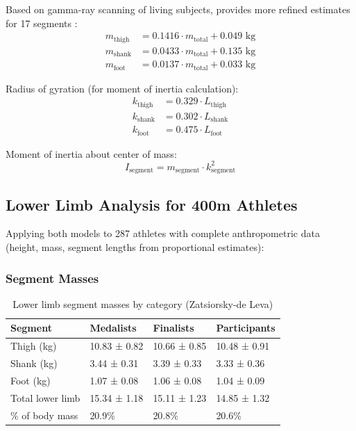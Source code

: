 Based on gamma-ray scanning of living subjects, provides more refined estimates for 17 segments \citep{deLeva1996}:
\begin{align}
m_{\text{thigh}} &= 0.1416 \cdot m_{\text{total}} + 0.049 \text{ kg} \\
m_{\text{shank}} &= 0.0433 \cdot m_{\text{total}} + 0.135 \text{ kg} \\
m_{\text{foot}} &= 0.0137 \cdot m_{\text{total}} + 0.033 \text{ kg}
\end{align}

Radius of gyration (for moment of inertia calculation):
\begin{align}
k_{\text{thigh}} &= 0.329 \cdot L_{\text{thigh}} \\
k_{\text{shank}} &= 0.302 \cdot L_{\text{shank}} \\
k_{\text{foot}} &= 0.475 \cdot L_{\text{foot}}
\end{align}

Moment of inertia about center of mass:
\begin{equation}
I_{\text{segment}} = m_{\text{segment}} \cdot k_{\text{segment}}^2
\end{equation}

\subsection{Lower Limb Analysis for 400m Athletes}

Applying both models to 287 athletes with complete anthropometric data (height, mass, segment lengths from proportional estimates):

\subsubsection{Segment Masses}

\begin{table}[H]
\centering
\caption{Lower limb segment masses by category (Zatsiorsky-de Leva)}
\begin{tabular}{@{}llll@{}}
\toprule
\textbf{Segment} & \textbf{Medalists} & \textbf{Finalists} & \textbf{Participants} \\
\midrule
Thigh (kg) & 10.83 ± 0.82 & 10.66 ± 0.85 & 10.48 ± 0.91 \\
Shank (kg) & 3.44 ± 0.31 & 3.39 ± 0.33 & 3.33 ± 0.36 \\
Foot (kg) & 1.07 ± 0.08 & 1.06 ± 0.08 & 1.04 ± 0.09 \\
\midrule
Total lower limb & 15.34 ± 1.18 & 15.11 ± 1.23 & 14.85 ± 1.32 \\
\% of body mass & 20.9\% & 20.8\% & 20.6\% \\
\bottomrule
\end{tabular}
\end{table}


